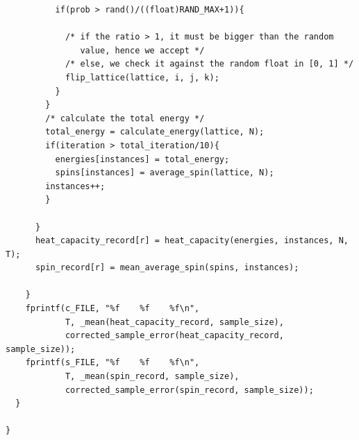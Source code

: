 \documentclass{article}
\begin{document}
\begin{verbatim}
          if(prob > rand()/((float)RAND_MAX+1)){

            /* if the ratio > 1, it must be bigger than the random
               value, hence we accept */
            /* else, we check it against the random float in [0, 1] */
            flip_lattice(lattice, i, j, k);
          }
        }
        /* calculate the total energy */
        total_energy = calculate_energy(lattice, N);
        if(iteration > total_iteration/10){
          energies[instances] = total_energy;
          spins[instances] = average_spin(lattice, N);
        instances++;
        }

      }
      heat_capacity_record[r] = heat_capacity(energies, instances, N, T);
      spin_record[r] = mean_average_spin(spins, instances);

    }
    fprintf(c_FILE, "%f    %f    %f\n",
            T, _mean(heat_capacity_record, sample_size),
            corrected_sample_error(heat_capacity_record, sample_size));
    fprintf(s_FILE, "%f    %f    %f\n",
            T, _mean(spin_record, sample_size),
            corrected_sample_error(spin_record, sample_size));
  }

}
\end{verbatim}

\hline
\end{document}
